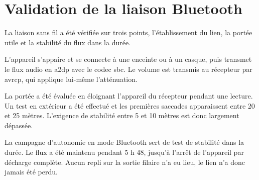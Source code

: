 \section{Validation de la liaison Bluetooth}
\label{sec:res_bluetooth}

La liaison sans fil a été vérifiée sur trois points, l'établissement du lien, la portée utile et la stabilité du flux dans la durée.

L'appareil s'appaire et se connecte à une enceinte ou à un casque, puis transmet le flux audio en \gls{a2dp} avec le codec \gls{sbc}. Le volume est transmis au récepteur par \gls{avrcp}, qui applique lui-même l'atténuation.

La portée a été évaluée en éloignant l'appareil du récepteur pendant une lecture. Un test en extérieur a été effectué et les premières saccades apparaissent entre 20 et 25 mètres. L'exigence de stabilité entre 5 et 10 mètres est donc largement dépassée.

La campagne d'autonomie en mode Bluetooth sert de test de stabilité dans la durée. Le flux a été maintenu pendant 5 h 48, jusqu'à l'arrêt de l'appareil par décharge complète. Aucun repli sur la sortie filaire n'a eu lieu, le lien n'a donc jamais été perdu.